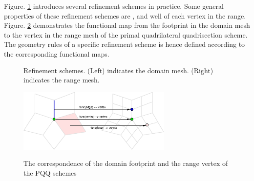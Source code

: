 \documentclass[letter,twoside,10pt]{article}
\begin{document}
Figure. \ref{fig:RefSchemes} introduces several refinement schemes in
practice. Some general properties of these refinement schemes are
,  and well
 of each vertex in the
range. Figure. \ref{fig:PQQMap} demonstrates the functional map from
the footprint in the domain mesh to the vertex in the range mesh of
the primal quadrilateral quadrisection scheme. The geometry rules of a
specific refinement scheme is hence defined according to the
corresponding functional maps.

\begin{figure}
  \centering
  \caption{Refinement schemes. (Left) indicates the domain mesh.
  (Right) indicates the range mesh. }
  \label{fig:RefSchemes}
\end{figure}

\begin{figure}
  \centering
  \includegraphics[width=3.0in]{pfigs/PQQRefMap.eps}\\
  \caption{The correspondence of the domain footprint and the 
           range vertex of the PQQ schemes}
  \label{fig:PQQMap}
\end{figure}
\end{document}
